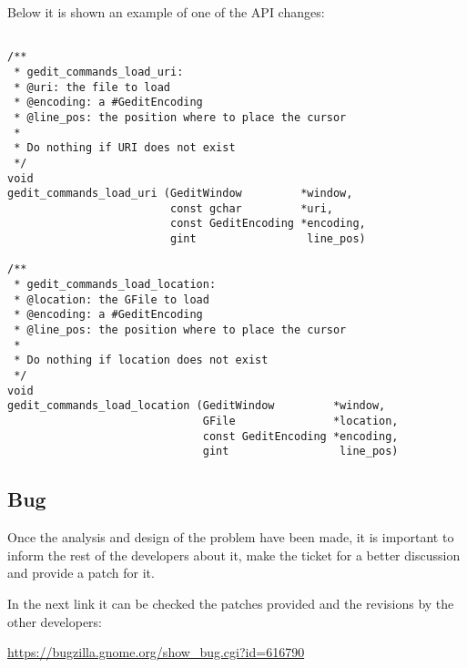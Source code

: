 Below it is shown an example of one of the API changes:

\begin{lstlisting}[style=GObject]

/**
 * gedit_commands_load_uri:
 * @uri: the file to load
 * @encoding: a #GeditEncoding
 * @line_pos: the position where to place the cursor
 *
 * Do nothing if URI does not exist
 */
void
gedit_commands_load_uri (GeditWindow         *window,
                         const gchar         *uri,
                         const GeditEncoding *encoding,
                         gint                 line_pos)

/**
 * gedit_commands_load_location:
 * @location: the GFile to load
 * @encoding: a #GeditEncoding
 * @line_pos: the position where to place the cursor
 *
 * Do nothing if location does not exist
 */
void
gedit_commands_load_location (GeditWindow         *window,
                              GFile               *location,
                              const GeditEncoding *encoding,
                              gint                 line_pos)

\end{lstlisting}

\newpage
\subsection{Bug}

Once the analysis and design of the problem have been made, it is important to inform the rest of the developers about it, make the ticket for a better discussion and provide a patch for it.

In the next link it can be checked the patches provided and the revisions by the other developers:

\noindent\url{https://bugzilla.gnome.org/show_bug.cgi?id=616790}
